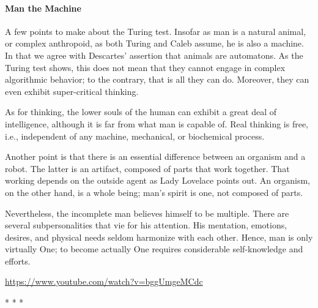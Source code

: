 \paragraph{Man the Machine}
A few points to make about the Turing test. Insofar as man is a natural animal, or complex anthropoid, as both Turing
and Caleb assume, he is also a machine. In that we agree with Descartes' assertion that animals
are automatons. As the Turing test shows, this does not mean that they cannot engage in complex algorithmic behavior;
to the contrary, that is all they can do. Moreover, they can even exhibit super-critical thinking.

As for thinking, the lower souls of the human can exhibit a great deal of intelligence, although it is far from what man
is capable of. Real thinking is free, i.e., independent of any machine, mechanical, or biochemical process.

Another point is that there is an essential difference between an organism and a robot. The latter is an artifact,
composed of parts that work together. That working depends on the outside agent as Lady Lovelace points out. An
organism, on the other hand, is a whole being; man's spirit is one, not composed of parts.

Nevertheless, the incomplete man believes himself to be multiple. There are several subpersonalities that vie for his
attention. His mentation, emotions, desires, and physical needs seldom harmonize with each other. Hence, man is only
virtually One; to become actually One requires considerable self-knowledge and efforts.

\url{https://www.youtube.com/watch?v=bggUmgeMCdc}




\begin{center}* * *\end{center}

